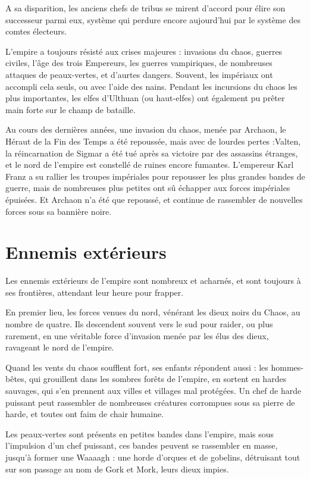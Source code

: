 \documentclass[10pt,a4paper]{book}
\begin{document}
A sa disparition, les anciens chefs de tribus se mirent d'accord pour élire son successeur parmi eux, système qui perdure encore aujourd'hui par le système des comtes électeurs. 

L'empire a toujours résisté aux crises majeures : invasions du chaos, guerres civiles, l'âge des trois Empereurs, les guerres vampiriques, de nombreuses attaques de peaux-vertes, et d'aurtes dangers. Souvent, les impériaux ont accompli cela seuls, ou avec l'aide des nains. Pendant les incursions du chaos les plus importantes, les elfes d'Ulthuan (ou haut-elfes) ont également pu prêter main forte sur le champ de bataille.

Au cours des dernières années, une invasion du chaos, menée par Archaon, le Héraut de la Fin des Temps a été repoussée, mais avec de lourdes pertes :Valten, la réincarnation de Sigmar a été tué après sa victoire par des assassins étranges, et le nord de l'empire est constellé de ruines encore fumantes. L'empereur Karl Franz a su rallier les troupes impériales pour repousser les plus grandes bandes de guerre, mais de nombreuses plus petites ont sû échapper aux forces impériales épuisées. Et Archaon n'a été que repoussé, et continue de rassembler de nouvelles forces sous sa bannière noire. 

\section{Ennemis extérieurs}
Les ennemis extérieurs de l'empire sont nombreux et acharnés, et sont toujours à ses frontières, attendant leur heure pour frapper.

En premier lieu, les forces venues du nord, vénérant les dieux noirs du Chaos, au nombre de quatre. Ils descendent souvent vers le sud pour raider, ou plus rarement, en une véritable force d'invasion menée par les élus des dieux, ravageant le nord de l'empire.

Quand les vents du chaos soufflent fort, ses enfants répondent aussi : les hommes-bêtes, qui grouillent dans les sombres forêts de l'empire, en sortent en hardes sauvages, qui s'en prennent aux villes et villages mal protégées. Un chef de harde puissant peut rassembler de nombreuses créatures corrompues sous sa pierre de harde, et toutes ont faim de chair humaine.

Les peaux-vertes sont présents en petites bandes dans l'empire, mais sous l'impulsion d'un chef puissant, ces bandes peuvent se rassembler en masse, jusqu'à former une Waaaagh : une horde d'orques et de gobelins, détruisant tout sur son passage au nom de Gork et Mork, leurs dieux impies.
\end{document}
